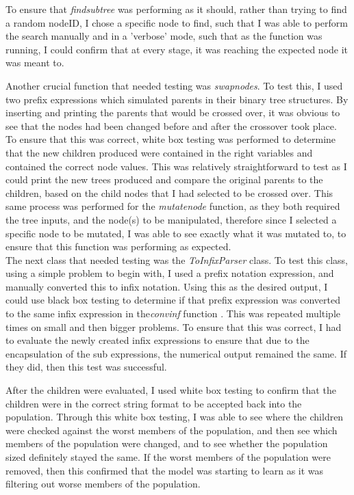 \documentclass[11pt]{article}
\begin{document}
To ensure that \textit{find\textunderscore subtree} was performing as it should, rather than trying to find a random nodeID, I chose a specific node to find, such that I was able to perform the search manually and in a 'verbose' mode, such that as the function was running, I could confirm that at every stage, it was reaching the expected node it was meant to.

Another crucial function that needed testing was \textit{swap\textunderscore nodes}. To test this, I used two prefix expressions which simulated parents in their binary tree structures. By inserting and printing the parents that would be crossed over, it was obvious to see that the nodes had been changed before and after the crossover took place. To ensure that this was correct, white box testing was performed to determine that the new children produced were contained in the right variables and contained the correct node values. This was relatively straightforward to test as I could print the new trees produced and compare the original parents to the children, based on the child nodes that I had selected to be crossed over.  This same process was performed for the \textit{mutate\textunderscore node} function, as they both required the tree inputs, and the node(s) to be manipulated, therefore since I selected a specific node to be mutated, I was able to see exactly what it was mutated to, to ensure that this function was performing as expected.\\

The next class that needed testing was the \textit{ToInfixParser} class. To test this class, using a simple problem to begin with, I used a prefix notation expression, and manually converted this to infix notation. Using this as the desired output, I could use black box testing to determine if that prefix expression was converted to the same infix expression in the\textit{conv\textunderscore inf}  function . This was repeated multiple times on small and then bigger problems. To ensure that this was correct, I had to evaluate the newly created infix expressions to ensure that due to the encapsulation of the sub expressions, the numerical output remained the same. If they did, then this test was successful. 

After the children were evaluated, I used white box testing to confirm that the children were in the correct string format to be accepted back into the population. Through this white box testing, I was able to see where the children were checked against the worst members of the population, and then see which members of the population were changed, and to see whether the population sized definitely stayed the same. If the worst members of the population were removed, then this confirmed that the model was starting to learn as it was filtering out worse members of the population. 
\end{document}
